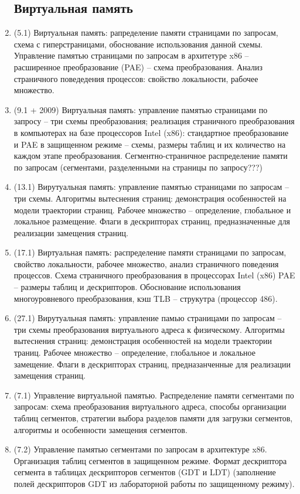 \documentclass[a4paper,14pt]{extreport}
\begin{document}
\begin{enumerate}
\subsection{Виртуальная память}
    \item (5.1) Виртуальная память: рапределение памяти страницами по
        запросам, схема с гиперстраницами, обоснование использования данной
        схемы. Управление памятью страницами по запросам в архитетуре x86 --
        расширенное преобразование (PAE) -- схема преобразования. Анализ
        страничного поведедения процессов: свойство локальности, рабочее
        множество.
    \item (9.1 + 2009) Виртуальная память: управление памятью страницами по
        запросу -- три схемы преобразования; реализация страничного
        преобразования в компьютерах на базе процессоров Intel (x86):
        стандартное преобразование и PAE в защищенном режиме -- схемы,
        размеры таблиц и их количество на каждом этапе преобразования.
        Сегментно-страничное распределение памяти по запросам (сегментами,
        разделенными на страницы по запросу???)
    \item (13.1) Вирутуальная память: управление памятью страницами по
        запросам -- три схемы. Алгоритмы вытеснения страниц: демонстрация
        особенностей на модели траектории страниц. Рабочее множество --
        определение, глобальное и локальное размещение. Флаги в дескрипторах
        страниц, предназначенные для реализации замещения страниц.
    \item (17.1) Виртуальная память: распределение памяти страницами по
        запросам, свойство локальности, рабочее множество, анализ
        страничного поведения процессов. Схема страничного преобразования в
        процессорах Intel (x86) PAE -- размеры таблиц и дескрипторов.
        Обоснование использования многоуровневого преобразования,
        кэш TLB -- струкутра (процессор 486).
    \item (27.1) Вирутуальная память: управление памью страницами по
        запросам -- три схемы преобразования виртуального адреса к физическому.
        Алгоритмы вытеснения страниц: демонстрация особенностей на
        модели траектории траниц. Рабочее множество -- определение,
        глобальное и локальное замещение. Флаги в дескрипторах страниц,
        предназанченные для реализации замещения страниц.
    \item (7.1) Управление виртуальной памятью. Распределение памяти
        сегментами по запросам: схема преобразования виртуального
        адреса, способы организации таблиц сегментов, стратегии выбора
        разделов памяти для загрузки сегментов, алгоритмы и особенности
        замещения сегментов.
    \item (7.2) Управление памятью сегментами по запросам в архитектуре x86.
        Организация таблиц сегментов в защищенном режиме. Формат
        дескриптора сегмента в таблицах дескрипторов сегментов (GDT и LDT)
        (заполнение полей дескрипторов GDT из лабораторной работы по защищенному
        режиму).
\end{enumerate}
\end{document}
